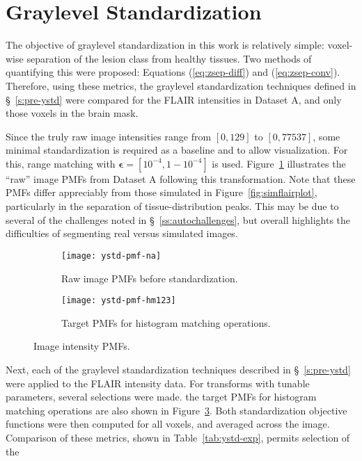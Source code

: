 \section{Graylevel Standardization}\label{ss:exp-ystd-jsep}
The objective of graylevel standardization in this work is relatively simple:
voxel-wise separation of the lesion class from healthy tissues.
Two methods of quantifying this were proposed:
Equations (\ref{eq:zsep-diff}) and (\ref{eq:zsep-conv}).
Therefore, using these metrics,
the graylevel standardization techniques defined in \S~\ref{s:pre-ystd} were compared
for the FLAIR intensities in Dataset A, and only those voxels in the brain mask.
\par
Since the truly raw image intensities range from $[0,129]$ to $[0,77537]$,
some minimal standardization is required as a baseline and to allow visualization.
For this, range matching with $\bm{\epsilon} = [10^{-4},1-10^{-4}]$ is used.
Figure~\ref{fig:ystd-pmf-raw} illustrates the ``raw'' image PMFs from Dataset A
following this transformation.
Note that these PMFs differ appreciably from those simulated in Figure~\ref{fig:simflairplot},
particularly in the separation of tissue-distribution peaks.
This may be due to several of the challenges noted in \S~\ref{ss:autochallenges},
but overall highlights the difficulties of segmenting real versus simulated images.
\par
\begin{figure}
  \begin{subfigure}{0.5\textwidth}
    \centering
    \texttt{[image: ystd-pmf-na]}
    \caption{Raw image PMFs before standardization.}%
    \label{fig:ystd-pmf-raw}
  \end{subfigure}
  \begin{subfigure}{0.5\textwidth}
    \centering
    \texttt{[image: ystd-pmf-hm123]}
    \caption{Target PMFs for histogram matching operations.}%
    \label{fig:ystd-pmf-target}
  \end{subfigure}
  \caption{Image intensity PMFs.}
\end{figure}
Next, each of the graylevel standardization techniques described in \S~\ref{s:pre-ystd}
were applied to the FLAIR intensity data.
For transforms with tunable parameters, several selections were made.
the target PMFs for histogram matching operations are also shown in Figure~\ref{fig:ystd-pmf-target}.
Both standardization objective functions were then computed for all voxels,
and averaged across the image.
Comparison of these metrics, shown in Table~\ref{tab:ystd-exp}, permits selection of the 
